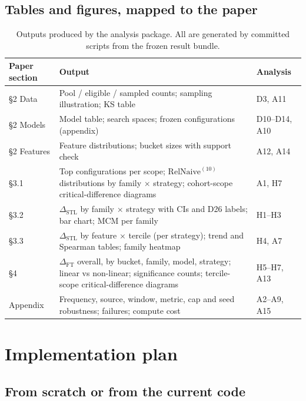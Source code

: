 \documentclass[11pt,a4paper]{article}
\newcommand{\RN}{\mathrm{RelNaive}^{(10)}}
\newcommand{\dstl}{\Delta_{\mathrm{STL}}}
\newcommand{\dft}{\Delta_{\mathrm{FT}}}
\begin{document}
\subsection{Tables and figures, mapped to the paper}

\begin{table}[h]
\centering\small
\caption{Outputs produced by the analysis package. All are generated by committed scripts from the
frozen result bundle.}\label{tab:outputs}
\begin{tabularx}{\linewidth}{@{}l X l@{}}
\toprule
Paper section & Output & Analysis \\
\midrule
\S2 Data & Pool / eligible / sampled counts; sampling illustration; KS table & D3, A11 \\
\S2 Models & Model table; search spaces; frozen configurations (appendix) & D10--D14, A10 \\
\S2 Features & Feature distributions; bucket sizes with support check & A12, A14 \\
\S3.1 & Top configurations per scope; $\RN$ distributions by family $\times$ strategy; cohort-scope critical-difference diagrams & A1, H7 \\
\S3.2 & $\dstl$ by family $\times$ strategy with CIs and D26 labels; bar chart; MCM per family & H1--H3 \\
\S3.3 & $\dstl$ by feature $\times$ tercile (per strategy); trend and Spearman tables; family heatmap & H4, A7 \\
\S4 & $\dft$ overall, by bucket, family, model, strategy; linear vs non-linear; significance counts; tercile-scope critical-difference diagrams & H5--H7, A13 \\
Appendix & Frequency, source, window, metric, cap and seed robustness; failures; compute cost & A2--A9, A15 \\
\bottomrule
\end{tabularx}
\end{table}

\section{Implementation plan}\label{sec:impl}

\subsection{From scratch or from the current code}
\end{document}
